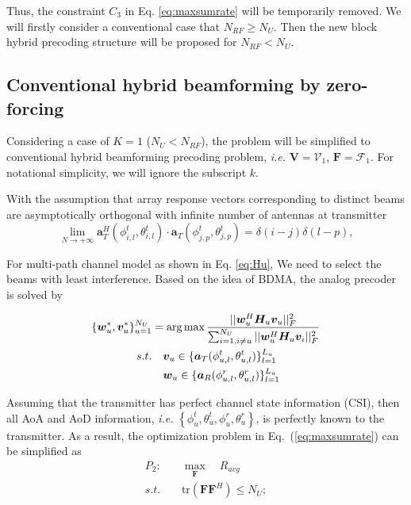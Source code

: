 \documentclass[conference]{IEEEtran}
\def\argmax{\mathop{\mbox{arg\,max}}}
\begin{document}
Thus, the constraint $C_3$ in Eq. \eqref{eq:maxsumrate} will be temporarily removed. We will firstly consider a conventional case that $N_{RF} \geq N_U$. Then the new block hybrid precoding structure will be proposed for $N_{RF}<N_U$.

\subsection{Conventional hybrid beamforming by zero-forcing}
Considering a case of $K=1$ ($N_U<N_{RF}$), the problem will be simplified to conventional hybrid beamforming precoding problem, \textit{i.e.} $\bm{V} = \bm{\mathcal{V}}_1$, $\bm{F} = \bm{\mathcal{F}}_1$. For notational simplicity, we will ignore the subscript $k$.

With the assumption that array response vectors corresponding to distinct beams are asymptotically orthogonal with infinite number of antennas at transmitter
\begin{equation}\label{Eq:assumption}
\lim_{N\rightarrow +\infty} \bm{a}^H_{T}(\phi^t_{i,l},\theta^t_{i,l}) \cdot\bm{a}_{T}(\phi^t_{j,p},\theta^t_{j,p})=\delta(i-j)\delta(l-p),
\end{equation}

For multi-path channel model as shown in Eq. \eqref{eq:Hu}, We need to select the beams with least interference. Based on the idea of BDMA, the analog precoder is solved by

\begin{align}\label{eq:analogprecoder}
\{\bm{w}^*_u,\bm{v}^*_u\}_{u=1}^{N_U} &= \argmax \frac{||\bm{w}^H_u \bm{H}_u \bm{v}_u||_F^2}{\sum_{i=1,i\neq u}^{N_U}||\bm{w}^H_u \bm{H}_u \bm{v}_i||_F^2}  \\ \nonumber
s.t. &\quad \bm{v}_u \in \{ \bm{a}_{T}(\phi^t_{u,l},\theta^t_{u,l})\}_{l=1}^{L_u}\\
&\quad \bm{w}_u \in \{ \bm{a}_{R}(\phi^r_{u,l},\theta^r_{u,l})\}_{l=1}^{L_u}
\end{align}

Assuming that the transmitter has perfect channel state information (CSI), then all AoA and AoD information, {\em i.e.} $\left\{\phi^t_u,\theta^t_u,\phi^r_u,\theta^r_u\right\}$, is perfectly known to the transmitter. As a result, the optimization problem in Eq.~(\ref{eq:maxsumrate}) can be simplified as
\begin{align}\label{eq:P2}
P_2: \quad&\max_{\bm F}\quad R_{avg}\\ \nonumber
s.t.\quad &\text{tr}(\bm{FF}^H) \leq N_U;\nonumber
\end{align}
\end{document}
